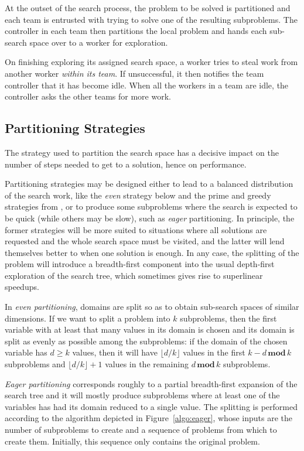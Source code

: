 \documentclass{llncs}
\begin{document}
At the outset of the search process, the problem to be solved is
partitioned and each team is entrusted with trying to solve one of the
resulting subproblems. The controller in each team then partitions the
local problem and hands each sub-search space over to a worker for
exploration.

On finishing exploring its assigned search space, a worker tries to
steal work from another worker \emph{within its team}. If
unsuccessful, it then notifies the team controller that it has become
idle. When all the workers in a team are idle, the controller asks the
other teams for more work.

\subsection{Partitioning Strategies}

The strategy used to partition the search space has a decisive impact
on the number of steps needed to get to a solution, hence on
performance.

Partitioning strategies may be designed either to lead to a balanced
distribution of the search work, like the \emph{even} strategy below
and the prime and greedy strategies from \cite{pas-silaghi01}, or to
produce some subproblems where the search is expected to be quick
(while others may be slow), such as \emph{eager} partitioning. In
principle, the former strategies will be more suited to situations
where all solutions are requested and the whole search space must be
visited, and the latter will lend themselves better to when one
solution is enough. In any case, the splitting of the problem will
introduce a breadth-first component into the usual depth-first
exploration of the search tree, which sometimes gives rise to
superlinear speedups.

In \emph{even partitioning}, domains are split so as to obtain
sub-search spaces of similar dimensions. If we want to split a problem
into $k$ subproblems, then the first variable with at least that many
values in its domain is chosen and its domain is split as evenly as
possible among the subproblems: if the domain of the chosen variable
has $d \ge k$ values, then it will have $\lfloor d / k \rfloor$ values
in the first $k - d \, \textbf{mod} \, k$ subproblems and $\lfloor d /
k \rfloor + 1$ values in the remaining $d \, \textbf{mod} \, k$
subproblems.

\emph{Eager partitioning} corresponds roughly to a partial
breadth-first expansion of the search tree and it will mostly produce
subproblems where at least one of the variables has had its domain
reduced to a single value. The splitting is performed according to the
algorithm depicted in Figure~\ref{algo:eager}, whose inputs are the
number of subproblems to create and a sequence of problems from which
to create them. Initially, this sequence only contains the original
problem.
\end{document}
